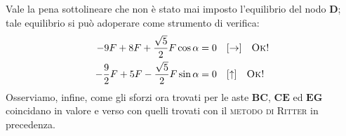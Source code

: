 Vale la pena sottolineare che non è stato mai imposto l'equilibrio del nodo $\mathbf{D}$; tale equilibrio si può adoperare come strumento di verifica:
\begin{align*}
-9F + 8F + \frac{\sqrt{5}}{2}F\cos{\alpha} &= 0 \quad [\rightarrow] \quad \textup{\textsc{Ok!}} \\
-\frac{9}{2}F + 5F -\frac{\sqrt{5}}{2}F\sin{\alpha} &= 0 \quad [\uparrow]  \quad \textup{\textsc{Ok!}}
\end{align*}
Osserviamo, infine, come gli sforzi ora trovati per le aste $\mathbf{B}\mathbf{C}$, $\mathbf{C}\mathbf{E}$ ed $\mathbf{E}\mathbf{G}$ coincidano in valore e verso con quelli trovati con il \textsc{metodo di Ritter} in precedenza.
